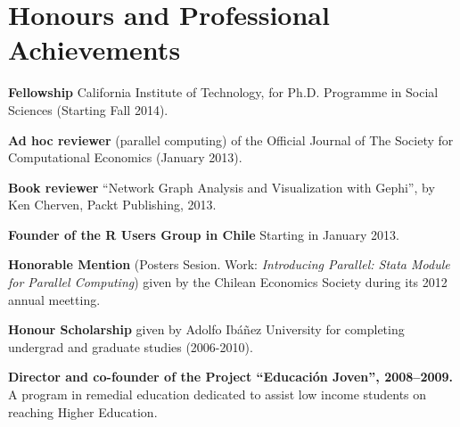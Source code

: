 \documentclass[letterpaper, 11pt]{article}
\def\footerlink{http://www.ggvega.com}
\renewenvironment{itemize}{
  \begin{list}{}{
    \setlength{\leftmargin}{0.45cm}
  }
}{
  \end{list}
}
\begin{document}
\section*{Honours and Professional Achievements}

\begin{itemize}
\item \textbf{Fellowship} California Institute of Technology, for Ph.D. Programme in Social Sciences (Starting Fall 2014).
\item \textbf{Ad hoc reviewer} (parallel computing) of the Official Journal of The Society for Computational Economics (January 2013).
\item \textbf{Book reviewer} ``Network Graph Analysis and Visualization with Gephi'', by Ken Cherven, Packt Publishing, 2013.
\item \textbf{Founder of the R Users Group in Chile} Starting in January 2013.
\item \textbf{Honorable Mention} (Posters Sesion. Work: \emph{Introducing Parallel: Stata Module for Parallel Computing}) given by the Chilean Economics Society during its 2012 annual meetting.
\item \textbf{Honour Scholarship} given by Adolfo Ib\'a\~nez University for completing undergrad and graduate studies (2006-2010).
\item \textbf{Director and co-founder of the Project ``Educaci\'on Joven'', 2008--2009.} A program in remedial education
 dedicated to assist low income students on reaching Higher Education.
\end{itemize}


\end{document}
